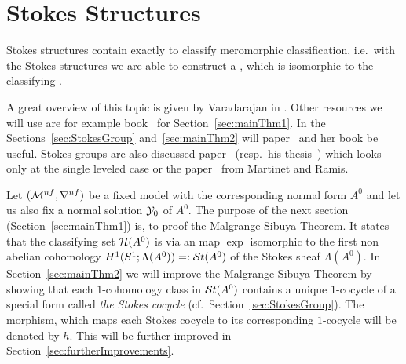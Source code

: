 \chapter{Stokes Structures}\label{chap:stokes}
Stokes structures contain exactly  to
classify meromorphic classification, i.e.\ with the Stokes structures we are
able to construct a , which is isomorphic to
the classifying .

A great overview of this topic is given by Varadarajan in
\cite{Varadarajan96linearmeromorphic}. Other resources we will use are for
example  book~\cite[section II]{sabbah2007isomonodromic} for
Section~\ref{sec:mainThm1}.
In the Sections~\ref{sec:StokesGroup} and~\ref{sec:mainThm2} will
 paper~\cite{Loday1994} and her book
\cite[Sec.4]{Loday2014} be useful.
Stokes groups are also discussed  paper~\cite{boalch} (resp.\
his thesis~\cite{thboalch}) which looks only at the single leveled case or the
paper~\cite{Martinet1991} from Martinet and Ramis.

Let $(\mathcal{M}^{nf},\nabla^{nf})$ be a fixed model with the corresponding normal
form $A^0$ and let us also fix a normal solution $\mathcal{Y}_0$ of $A^0$.
The purpose of the next section (Section~\ref{sec:mainThm1}) is, to proof the
Malgrange-Sibuya Theorem.
It states that the classifying set $\mathcal{H}(A^0)$ is via an map $\exp$ isomorphic
to the first non abelian cohomology $H^1(S^1;\Lambda(A^0))=:\mathcal{S}{}t(A^0)$ of the
Stokes sheaf $\Lambda(A^0)$.
In Section~\ref{sec:mainThm2} we will improve the Malgrange-Sibuya Theorem by
showing that each $1$-cohomology class in $\mathcal{S}{}t(A^0)$ contains a unique
$1$-cocycle of a special form called \emph{the Stokes cocycle}
(cf.\ Section~\ref{sec:StokesGroup}).
The morphism, which maps each Stokes cocycle to its corresponding $1$-cocycle
will be denoted by $h$.
This will be further improved in Section~\ref{sec:furtherImprovements}.

